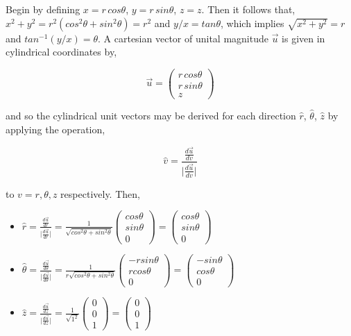 \documentclass[12pt]{article}
\theoremstyle{definition}
\numberwithin{equation}{section}
\begin{document}
Begin by defining $x=r\, cos\theta$, $y=r\, sin\theta$, $z=z$. Then it follows that, $x^{2}+y^{2}=r^{2}(cos^{2}\theta + sin^{2}\theta)=r^{2}$ and $y/x=tan\theta$, which implies $\sqrt{x^{2}+y^{2}} =r$ and $tan^{-1}(y/x)=\theta$. A cartesian vector of unital magnitude $\vec{u}$ is given in cylindrical coordinates by,

\begin{equation}
\vec{u}= \left(\begin{array}{c}r\, cos\theta\\ r\, sin\theta\\ z \end{array}\right)
\end{equation}

and so the cylindrical unit vectors may be derived for each direction $\hat{r}$, $\hat{\theta}$, $\hat{z}$ by applying the operation,

\begin{equation}
\hat{v}=\frac{\frac{d\vec{u}}{dv}}{{\vert{\frac{d\vec{u}}{dv}\vert}}}
\end{equation}

to $v=r,\theta ,z$ respectively. Then,

\begin{itemize}
\item $\hat{r}=\frac{\frac{d\vec{u}}{dr}}{\vert{\frac{d\vec{u}}{dr}}\vert}=\frac{1}{\sqrt{cos^{2}\theta+sin^{2}\theta}}\left(\begin{array}{c}cos\theta\\sin\theta\\0\end{array}\right)=\left(\begin{array}{c}cos\theta\\sin\theta\\0\end{array}\right)$
\item $\hat{\theta}=\frac{\frac{d\vec{u}}{d\theta}}{\vert{\frac{d\vec{u}}{d\theta}}\vert}=\frac{1}{r\sqrt{cos^{2}\theta+sin^{2}\theta}}\left(\begin{array}{c}-rsin\theta\\rcos\theta\\0\end{array}\right)=\left(\begin{array}{c}-sin\theta\\cos\theta\\0\end{array}\right)$
\item $\hat{z}=\frac{\frac{d\vec{u}}{dz}}{\vert{\frac{d\vec{u}}{dz}}\vert}=\frac{1}{\sqrt{1^{2}}}\left(\begin{array}{c}0\\0\\1\end{array}\right)=\left(\begin{array}{c}0\\0\\1\end{array}\right)$
\end{itemize}
\end{document}
